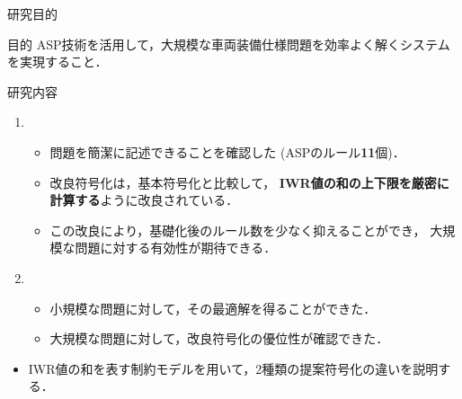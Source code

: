 \documentclass[dvipdfmx, 11pt,]{beamer}
\begin{document}
\begin{frame}{研究目的}
  \begin{alertblock}{目的}
    ASP技術を活用して，大規模な車両装備仕様問題を効率よく解くシステム
    を実現すること．
  \end{alertblock}

  \begin{block}{研究内容}
    \begin{enumerate}
    \item {}
      \begin{itemize}
      \item 問題を簡潔に記述できることを確認した
        (ASPのルール\alert{\bf 11}個)．
      \item 改良符号化は，基本符号化と比較して，
        \alert{\bf IWR値の和の上下限を厳密に計算する}ように改良されている．
	\item この改良により，基礎化後のルール数を少なく抑えることができ，
		大規模な問題に対する有効性が期待できる．
      \end{itemize}
    \item {}
      \begin{itemize}
      \item 小規模な問題に対して，その最適解を得ることができた．
      \item 大規模な問題に対して，改良符号化の優位性が確認できた．
      \end{itemize}
    \end{enumerate}
  \end{block}
  \pause
  \begin{itemize}
  	\item IWR値の和を表す制約モデルを用いて，2種類の提案符号化の違いを説明する．
  \end{itemize}
\end{frame}
\end{document}
